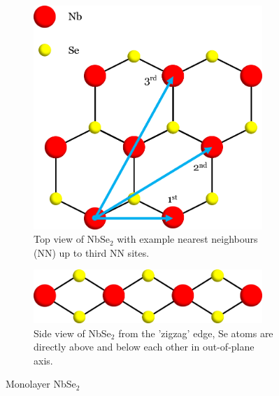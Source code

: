 \documentclass[12pt]{report} %
\begin{document}
\begin{figure}[t]
\centering
  \begin{subfigure}[t]{0.45\textwidth}
    \centering
    \includegraphics[width=0.95\textwidth]{NbSe_top.png}
    \caption{
      Top view of NbSe$_2$ with example nearest neighbours (NN) up to third NN sites.
    }
  \end{subfigure}
  \hfill
  \begin{subfigure}[t]{0.45\textwidth}
    \centering
    \includegraphics[width=0.95\textwidth]{NbSe_side.png}
    \caption{
      Side view of NbSe$_2$ from the 'zigzag' edge, Se atoms are directly above and below each other in out-of-plane axis.
    }
  \end{subfigure}
  \caption{
    Monolayer NbSe$_2$
  }
\end{figure}
\end{document}
